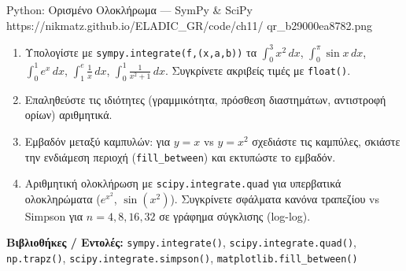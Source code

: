 \begin{pybox}{Python: Ορισμένο Ολοκλήρωμα — SymPy \& SciPy}%
             {https://nikmatz.github.io/ELADIC_GR/code/ch11/}%
             {qr_b29000ea8782.png}
\label{py:ch11_defintegral}
\begin{enumerate}[label=(\alph*),itemsep=2pt]
  \item Υπολογίστε με \texttt{sympy.integrate(f,(x,a,b))} τα
    $\int_0^3 x^2\,dx$, $\int_0^{\pi}\sin x\,dx$,
    $\int_0^1 e^x\,dx$, $\int_1^e\frac{1}{x}\,dx$,
    $\int_0^1\frac{1}{x^2+1}\,dx$.
    Συγκρίνετε ακριβείς τιμές με \texttt{float()}.
  \item Επαληθεύστε τις ιδιότητες (γραμμικότητα, πρόσθεση
    διαστημάτων, αντιστροφή ορίων) αριθμητικά.
  \item Εμβαδόν μεταξύ καμπυλών: για $y=x$ vs $y=x^2$
    σχεδιάστε τις καμπύλες, σκιάστε την ενδιάμεση περιοχή
    (\texttt{fill\_between}) και εκτυπώστε το εμβαδόν.
  \item Αριθμητική ολοκλήρωση με \texttt{scipy.integrate.quad}
    για υπερβατικά ολοκληρώματα ($e^{x^2}$, $\sin(x^2)$).
    Συγκρίνετε σφάλματα κανόνα τραπεζίου vs Simpson
    για $n = 4, 8, 16, 32$ σε γράφημα σύγκλισης (log-log).
\end{enumerate}
\medskip
\textbf{Βιβλιοθήκες / Εντολές:}
\texttt{sympy.integrate()}, \texttt{scipy.integrate.quad()},
\texttt{np.trapz()}, \texttt{scipy.integrate.simpson()},
\texttt{matplotlib.fill\_between()}
\end{pybox}
